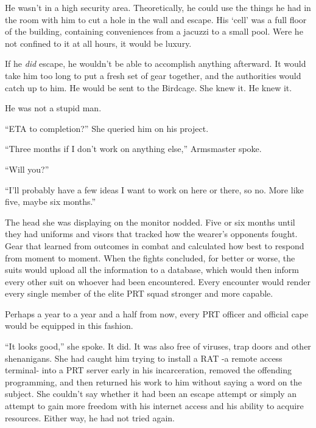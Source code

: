 He wasn't in a high security area.  Theoretically, he could use the things he had in the room with him to cut a hole in the wall and escape.  His `cell' was a full floor of the building, containing conveniences from a jacuzzi to a small pool.  Were he not confined to it at all hours, it would be luxury.



If he \emph{did} escape, he wouldn't be able to accomplish anything afterward.  It would take him too long to put a fresh set of gear together, and the authorities would catch up to him.  He would be sent to the Birdcage.  She knew it.  He knew it.



He was not a stupid man.



``ETA to completion?''  She queried him on his project.



``Three months if I don't work on anything else,'' Armsmaster spoke.



``Will you?''



``I'll probably have a few ideas I want to work on here or there, so no.  More like five, maybe six months.''



The head she was displaying on the monitor nodded.  Five or six months until they had uniforms and visors that tracked how the wearer's opponents fought.  Gear that learned from outcomes in combat and calculated how best to respond from moment to moment.  When the fights concluded, for better or worse, the suits would upload all the information to a database, which would then inform every other suit on whoever had been encountered.  Every encounter would render every single member of the elite PRT squad stronger and more capable.



Perhaps a year to a year and a half from now, every PRT officer and official cape would be equipped in this fashion.



``It looks good,'' she spoke.  It did.  It was also free of viruses, trap doors and other shenanigans.  She had caught him trying to install a RAT -a remote access terminal- into a PRT server early in his incarceration, removed the offending programming, and then returned his work to him without saying a word on the subject.  She couldn't say whether it had been an escape attempt or simply an attempt to gain more freedom with his internet access and his ability to acquire resources.  Either way, he had not tried again.



